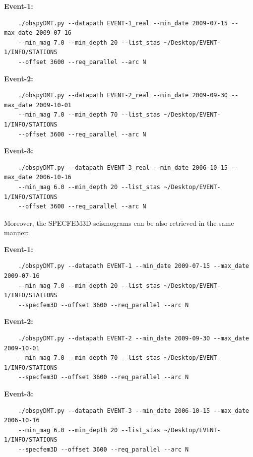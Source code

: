 \documentclass{article}
\begin{document}
\textbf{Event-1:}

\begin{verbatim}
    ./obspyDMT.py --datapath EVENT-1_real --min_date 2009-07-15 --max_date 2009-07-16 
    --min_mag 7.0 --min_depth 20 --list_stas ~/Desktop/EVENT-1/INFO/STATIONS 
    --offset 3600 --req_parallel --arc N
\end{verbatim}

\textbf{Event-2:}

\begin{verbatim}
    ./obspyDMT.py --datapath EVENT-2_real --min_date 2009-09-30 --max_date 2009-10-01 
    --min_mag 7.0 --min_depth 70 --list_stas ~/Desktop/EVENT-1/INFO/STATIONS 
    --offset 3600 --req_parallel --arc N
\end{verbatim}

\textbf{Event-3:}

\begin{verbatim}
    ./obspyDMT.py --datapath EVENT-3_real --min_date 2006-10-15 --max_date 2006-10-16 
    --min_mag 6.0 --min_depth 20 --list_stas ~/Desktop/EVENT-1/INFO/STATIONS 
    --offset 3600 --req_parallel --arc N
\end{verbatim}

Moreover, the SPECFEM3D seismograms can be also retrieved in the same manner:

\textbf{Event-1:}

\begin{verbatim}
    ./obspyDMT.py --datapath EVENT-1 --min_date 2009-07-15 --max_date 2009-07-16 
    --min_mag 7.0 --min_depth 20 --list_stas ~/Desktop/EVENT-1/INFO/STATIONS 
    --specfem3D --offset 3600 --req_parallel --arc N
\end{verbatim}

\textbf{Event-2:}

\begin{verbatim}
    ./obspyDMT.py --datapath EVENT-2 --min_date 2009-09-30 --max_date 2009-10-01 
    --min_mag 7.0 --min_depth 70 --list_stas ~/Desktop/EVENT-1/INFO/STATIONS 
    --specfem3D --offset 3600 --req_parallel --arc N
\end{verbatim}

\textbf{Event-3:}

\begin{verbatim}
    ./obspyDMT.py --datapath EVENT-3 --min_date 2006-10-15 --max_date 2006-10-16 
    --min_mag 6.0 --min_depth 20 --list_stas ~/Desktop/EVENT-1/INFO/STATIONS 
    --specfem3D --offset 3600 --req_parallel --arc N
\end{verbatim}
\end{document}
